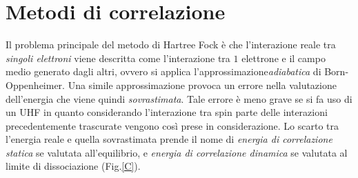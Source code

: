 \documentclass[oneside]{amsbook}
\numberwithin{section}{chapter}
\numberwithin{equation}{section}
\numberwithin{figure}{section}
\begin{document}
\chapter{Metodi di correlazione}
Il problema principale del metodo di Hartree Fock è che l'interazione reale tra \emph{singoli elettroni} viene descritta come l'interazione tra $1$ elettrone e il campo medio generato dagli altri, ovvero si applica l'approssimazione\emph{adiabatica} di Born-Oppenheimer. Una simile approssimazione provoca un errore nella valutazione dell'energia che viene quindi \emph{sovrastimata}. Tale errore è meno grave se si fa uso di un UHF in quanto considerando l'interazione tra spin parte delle interazioni precedentemente trascurate vengono così prese in considerazione. Lo scarto tra l'energia reale e quella sovrastimata prende il nome di \emph{energia di correlazione statica} se valutata all'equilibrio, e \emph{energia di correlazione dinamica} se valutata al limite di dissociazione (Fig.\ref{C}).
\end{document}
